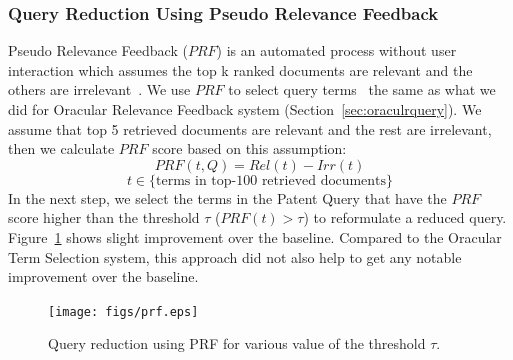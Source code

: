 \subsubsection{Query Reduction Using Pseudo Relevance Feedback}
Pseudo Relevance Feedback ($\mathit{PRF}$) is an automated process without user interaction which assumes the top k ranked documents are relevant and the others are irrelevant~\citep{Baeza-Yates2011}. We use $\mathit{PRF}$ to select query terms~\cite{maxwell2013compact} the same as what we did for Oracular Relevance Feedback system (Section~\ref{sec:oraculrquery}). We assume that top 5 retrieved documents are relevant and the rest are irrelevant, then we calculate $\mathit{PRF}$ score based on this assumption:  
\begin{equation}
PRF(t,Q)=Rel(t)-Irr(t) 
 \label{eq:score}
\end{equation}
\vspace*{-2ex}
\begin{displaymath}t\in \lbrace \mbox{terms in top-100 retrieved documents}\rbrace\end{displaymath}
In the next step, we select the terms in the Patent Query that have the  $\mathit{PRF}$ score higher than the threshold $\tau$ ($PRF(t)>\tau$) to reformulate a reduced query. Figure~\ref{fig:prf} shows slight improvement over the baseline. Compared to the Oracular Term Selection system, this approach did not also help to get any notable improvement over the baseline.
\begin{figure}[t!]
   \centering
   \texttt{[image: figs/prf.eps]}
   \caption{Query reduction using PRF for various value of the threshold $\tau$.}   
   \label{fig:prf} 
\end{figure}
